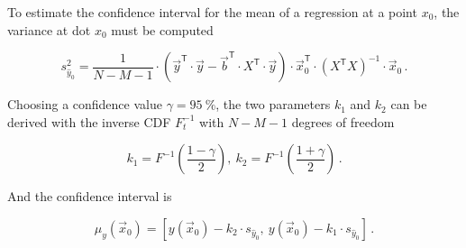 To estimate the confidence interval for the mean of a regression at a point $x_0$, the variance at dot $x_0$ must be computed \cite{dffs}

\begin{equation}
s_{\hat{y}_0}^2 = \frac{1}{N-M-1}\cdot\left(\vec{y}^{\mathsf T}\cdot\vec{y}-\vec{b}^{\mathsf T}\cdot X^{\mathsf T}\cdot \vec{y}\right)\cdot \vec{x}_0^{\mathsf T}\cdot \left(X^{\mathsf T} X\right)^{-1} \cdot \vec{x}_0\,.
\end{equation}

Choosing a confidence value $\gamma = \SI{95}{\percent}$, the two parameters $k_1$ and $k_2$ can be derived with the inverse \ac{CDF} $F_t^{-1}$ with $N-M-1$ degrees of freedom

\begin{equation}
k_1 = F^{-1}\left(\frac{1-\gamma}{2}\right),\ k_2 = F^{-1}\left(\frac{1+\gamma}{2}\right)\,.
\end{equation}

And the confidence interval is

\begin{equation}
\mu_y\left(\vec{x}_0\right) =\left[ y\left(\vec{x}_0\right)-k_2\cdot s_{\hat{y}_0},\ y\left(\vec{x}_0\right)-k_1\cdot s_{\hat{y}_0}\right]\,.
\label{eq:conv}
\end{equation}


